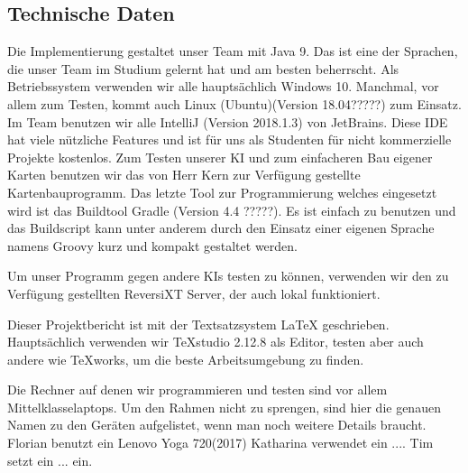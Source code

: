 \documentclass[12pt,a4paper,bibliography=totocnumbered,listof=totocnumbered]{scrartcl}
\begin{document}
    \subsection{Technische Daten}

    Die Implementierung gestaltet unser Team mit Java 9. Das ist eine der Sprachen, die unser Team im Studium gelernt hat und am besten beherrscht. Als Betriebssystem verwenden wir alle hauptsächlich Windows 10. Manchmal, vor allem zum Testen, kommt auch Linux (Ubuntu)(Version 18.04?????) zum Einsatz. Im Team benutzen wir alle IntelliJ (Version 2018.1.3) von JetBrains. Diese IDE hat viele nützliche Features und ist für uns als Studenten für nicht kommerzielle Projekte kostenlos. Zum Testen unserer KI und zum einfacheren Bau eigener Karten benutzen wir das von Herr Kern zur Verfügung gestellte Kartenbauprogramm.
    Das letzte Tool zur Programmierung welches eingesetzt wird ist das Buildtool Gradle (Version 4.4 ?????). Es ist einfach zu benutzen und das Buildscript kann unter anderem durch den Einsatz einer eigenen Sprache namens Groovy kurz und kompakt gestaltet werden.

    Um unser Programm gegen andere KIs testen zu können, verwenden wir den zu Verfügung gestellten ReversiXT Server, der auch lokal funktioniert.

    Dieser Projektbericht ist mit der Textsatzsystem LaTeX geschrieben. Hauptsächlich verwenden wir TeXstudio 2.12.8 als Editor, testen aber auch andere wie TeXworks, um die beste Arbeitsumgebung zu finden.

    Die Rechner auf denen wir programmieren und testen sind vor allem \glqq Mittelklasselaptops\grqq. Um den Rahmen nicht zu sprengen, sind hier die genauen Namen zu den Geräten aufgelistet, wenn man noch weitere Details braucht. Florian benutzt ein Lenovo Yoga 720(2017) %
    Katharina verwendet ein ....%
    Tim setzt ein ... ein.%
\end{document}
